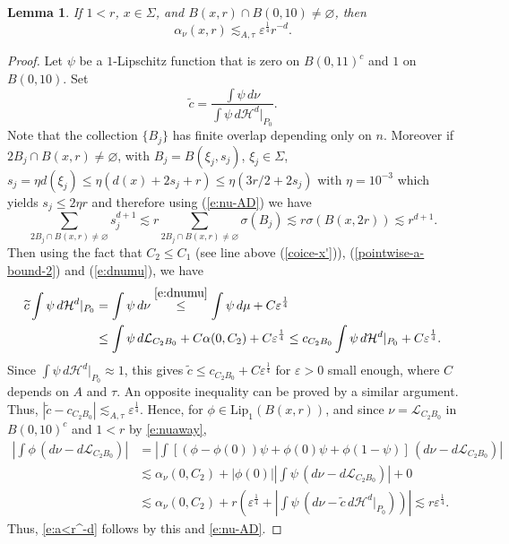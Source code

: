 \documentclass[11pt]{amsart}
\newcommand{\LL}{{\mathcal L}}
\newcommand{\rf}[1]{{(\ref{#1})}}
\newcommand{\ve}{{\varepsilon}}
\newcommand{\wt}[1]{{\widetilde{#1}}}
\newtheorem{lemma}[theorem]{Lemma}
\theoremstyle{definition}
\theoremstyle{remark}
\numberwithin{equation}{section}
\def\cH{{\mathcal{H}}}
\newcommand{\ps}[1]{\left( #1 \right)}
\def\lec{\lesssim}
\def\lec{\lesssim}
\def\Lip{\textrm{Lip}}
\newcommand{\jonas}[1]{}%
\begin{document}
\begin{lemma}
	If $1<r$, $x\in \Sigma$, and $B(x,r) \cap B(0,10)\neq\varnothing$, then
	\begin{equation}\label{e:a<r^-d}
	\alpha_{\nu}(x,r)\lec_{A,\tau} \ve^{\frac{1}{4}} r^{-d}.	
	 	\end{equation}
\end{lemma}
 
\begin{proof}
	Let $\psi$ be a $1$-Lipschitz function that is zero on $B(0,11)^{c}$ and $1$ on $B(0,10)$. Set
	\[
	\wt c=\frac{\int \psi\, d\nu}{\int \psi\, d\cH^{d}|_{P_{0}}}.
	\]
	{%
	Note that the collection $\{B_j\}$ has finite overlap depending only on $n$. Moreover
	if $2B_{j}\cap B(x,r)\neq\varnothing$, with $B_j=B(\xi_j,s_j)$, $\xi_j\in\Sigma$, $s_j=\eta d(\xi_j)\le \eta (d(x) +2s_j+r)\le \eta(3r/2+2s_j)$ with $\eta=10^{-3}$ which yields $s_j\le 2\eta r$ and therefore
	using \rf{e:nu-AD} we have
	\begin{equation}\label{sum-bound-1}
	 \sum_{2B_{j}\cap B(x,r)\neq\varnothing}  s_{j}^{d+1}\lec r\sum_{2B_{j}\cap B(x,r)\neq\varnothing}\sigma(B_j) 
	 \lec r\sigma(B(x, 2r))\lec r^{d+1}.
		\end{equation}
	Then using the fact that $C_2\le C_1$ (see line above \rf{coice-x'}), \rf{pointwise-a-bound-2} and \rf{e:dnumu}, we have
	}
	\begin{align*}
	\wt c\int \psi\, d\cH^{d}|_{P_{0}}  & = \int \psi\, d\nu
	 \stackrel{\eqref{e:dnumu}}{\leq}
	 \int \psi\, d\mu+ C\ve^{\frac{1}{4}}
	\\ & \leq \int \psi\, d\LL_{C_{2}B_{0}} +C\alpha(0,C_{2}) + C\ve^{\frac{1}{4}} 
	\leq c_{C_{2}B_{0}} \int \psi \,d\cH^{d}|_{P_{0}} + C\ve^{\frac{1}{4}}.
	\end{align*}
	Since $\int \psi\, d\cH^{d}|_{P_{0}} \approx 1$, this gives $\wt c\leq c_{C_{2}B_{0}}+C\ve^{\frac{1}{4}}$ for $\ve>0$ small enough, where $C$ depends on $A$ and $\tau$. An opposite inequality can be proved by 
	a similar argument. Thus, $|\wt c-c_{C_{2}B_{0}}|\lec_{A,\tau}\! \ve^{\frac{1}{4}}$. Hence, for $\phi\in \Lip_{1}(B(x,r))$, and since $\nu = \LL_{C_{2}B_{0}}$ in $B(0,10)^c$ and $1<r$ by \eqref{e:nuaway},
	\begin{align*}
	\left|\int \phi \,(d\nu- d\LL_{C_{2}B_{0}})\right|
	& = \left|\int [  (\phi -\phi(0))\psi + \phi(0)\psi + \phi (1-\psi)]\, (d\nu- d\LL_{C_{2}B_{0}})\right|\\
	& \lec \alpha_{\nu}(0,C_{2})+ |\phi(0)| \left|\int \psi \, (d\nu- d\LL_{C_{2}B_{0}})\right| + 0\\
	& \lec \alpha_{\nu}(0,C_{2})+ r \ps{ \ve^{\frac{1}{4}}  +  \left|\int \psi \, (d\nu- \wt c \,d \cH^{d}|_{P_{0}})}\right|
	 \lec  r\ve^{\frac{1}{4}}.
	\end{align*}
Thus, \eqref{e:a<r^-d} follows by this and \eqref{e:nu-AD}.
\end{proof}
\end{document}
